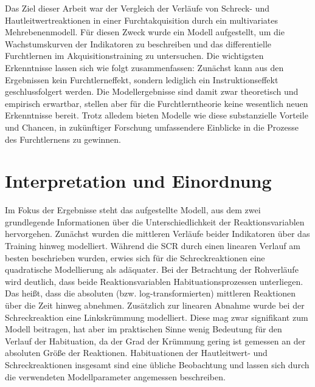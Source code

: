 

	
	Das Ziel dieser Arbeit war der Vergleich der Verläufe von Schreck- und Hautleitwertreaktionen in einer Furchtakquisition durch ein multivariates Mehrebenenmodell. 
	Für diesen Zweck wurde ein Modell aufgestellt, um die Wachstumskurven der Indikatoren zu beschreiben und das differentielle Furchtlernen im Akquisitionstraining zu untersuchen. Die wichtigsten Erkenntnisse lassen sich wie folgt zusammenfassen: Zunächst kann aus den Ergebnissen kein Furchtlerneffekt, sondern lediglich ein Instruktionseffekt geschlussfolgert werden. Die Modellergebnisse sind damit zwar theoretisch und empirisch erwartbar, stellen aber für die Furchtlerntheorie keine wesentlich neuen Erkenntnisse bereit. Trotz alledem bieten Modelle wie diese substanzielle Vorteile und Chancen, in zukünftiger Forschung umfassendere Einblicke in die Prozesse des Furchtlernens zu gewinnen.



\section{Interpretation und Einordnung}	\label{interpretation}

	Im Fokus der Ergebnisse steht das aufgestellte Modell, aus dem zwei grundlegende Informationen über die Unterschiedlichkeit der Reaktionsvariablen hervorgehen. 
	Zunächst wurden die mittleren Verläufe beider Indikatoren über das Training hinweg modelliert. Während die SCR durch einen linearen Verlauf am besten beschrieben wurden, erwies sich für die Schreckreaktionen eine quadratische Modellierung als adäquater. Bei der Betrachtung der Rohverläufe wird deutlich, dass beide Reaktionsvariablen Habituationsprozessen unterliegen. Das heißt, dass die absoluten (bzw. log-transformierten) mittleren Reaktionen über die Zeit hinweg abnehmen. 
	Zusätzlich zur linearen Abnahme wurde bei der Schreckreaktion eine Linkskrümmung modelliert. Diese mag zwar signifikant zum Modell beitragen, hat aber im praktischen Sinne wenig Bedeutung für den Verlauf der Habituation, da der Grad der Krümmung gering ist gemessen an der absoluten Größe der Reaktionen. 
	Habituationen der Hautleitwert- und Schreckreaktionen insgesamt sind eine übliche Beobachtung \parencite[z.\,B.][]{BRADLEY1993b} und lassen sich durch die verwendeten Modellparameter angemessen beschreiben. 

